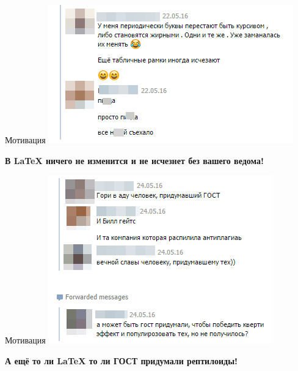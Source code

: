 \documentclass[newPxFont]{beamer}
\begin{document}
\begin{frame}{Мотивация}
    \centering
    \includegraphics[scale=0.5]{m8.png}
    
    \vfill
    \alert{\textbf{В \LaTeX{} ничего не изменится и не исчезнет без вашего ведома!}}
\end{frame}


\begin{frame}{Мотивация}
    \centering
    \includegraphics[scale=0.5]{m10.png}
    
    \vfill
    \alert{\textbf{А ещё то ли \LaTeX{} то ли ГОСТ придумали рептилоиды!}}
\end{frame}
\end{document}
